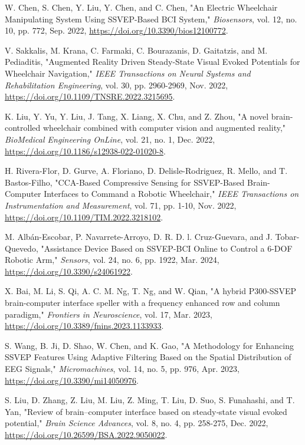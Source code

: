  W. Chen, S. Chen, Y. Liu, Y. Chen, and C. Chen, "An Electric Wheelchair Manipulating System Using SSVEP-Based BCI System," \textit{Biosensors}, vol. 12, no. 10, pp. 772, Sep. 2022, \url{https://doi.org/10.3390/bios12100772}.

 V. Sakkalis, M. Krana, C. Farmaki, C. Bourazanis, D. Gaitatzis, and M. Pediaditis, "Augmented Reality Driven Steady-State Visual Evoked Potentials for Wheelchair Navigation," \textit{IEEE Transactions on Neural Systems and Rehabilitation Engineering}, vol. 30, pp. 2960-2969, Nov. 2022, \url{https://doi.org/10.1109/TNSRE.2022.3215695}.

 K. Liu, Y. Yu, Y. Liu, J. Tang, X. Liang, X. Chu, and Z. Zhou, "A novel brain-controlled wheelchair combined with computer vision and augmented reality," \textit{BioMedical Engineering OnLine}, vol. 21, no. 1, Dec. 2022, \url{https://doi.org/10.1186/s12938-022-01020-8}.

 H. Rivera-Flor, D. Gurve, A. Floriano, D. Delisle-Rodriguez, R. Mello, and T. Bastos-Filho, "CCA-Based Compressive Sensing for SSVEP-Based Brain-Computer Interfaces to Command a Robotic Wheelchair," \textit{IEEE Transactions on Instrumentation and Measurement}, vol. 71, pp. 1-10, Nov. 2022, \url{https://doi.org/10.1109/TIM.2022.3218102}.

 M. Albán-Escobar, P. Navarrete-Arroyo, D. R. D. l. Cruz-Guevara, and J. Tobar-Quevedo, "Assistance Device Based on SSVEP-BCI Online to Control a 6-DOF Robotic Arm," \textit{Sensors}, vol. 24, no. 6, pp. 1922, Mar. 2024, \url{https://doi.org/10.3390/s24061922}.

 X. Bai, M. Li, S. Qi, A. C. M. Ng, T. Ng, and W. Qian, "A hybrid P300-SSVEP brain-computer interface speller with a frequency enhanced row and column paradigm," \textit{Frontiers in Neuroscience}, vol. 17, Mar. 2023, \url{https://doi.org/10.3389/fnins.2023.1133933}.

 S. Wang, B. Ji, D. Shao, W. Chen, and K. Gao, "A Methodology for Enhancing SSVEP Features Using Adaptive Filtering Based on the Spatial Distribution of EEG Signals," \textit{Micromachines}, vol. 14, no. 5, pp. 976, Apr. 2023, \url{https://doi.org/10.3390/mi14050976}.

 S. Liu, D. Zhang, Z. Liu, M. Liu, Z. Ming, T. Liu, D. Suo, S. Funahashi, and T. Yan, "Review of brain–computer interface based on steady‐state visual evoked potential," \textit{Brain Science Advances}, vol. 8, no. 4, pp. 258-275, Dec. 2022, \url{https://doi.org/10.26599/BSA.2022.9050022}.

